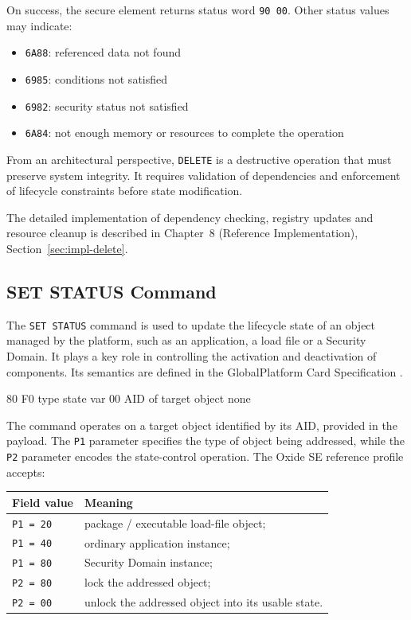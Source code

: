 On success, the secure element returns status word \texttt{90 00}. Other status values
may indicate:
\begin{itemize}
\item \texttt{6A88}: referenced data not found
\item \texttt{6985}: conditions not satisfied
\item \texttt{6982}: security status not satisfied
\item \texttt{6A84}: not enough memory or resources to complete the operation
\end{itemize}

From an architectural perspective, \texttt{DELETE} is a destructive operation
that must preserve system integrity. It requires validation of dependencies and
enforcement of lifecycle constraints before state modification.

The detailed implementation of dependency checking, registry updates and
resource cleanup is described in Chapter~8 (Reference Implementation),
Section~\ref{sec:impl-delete}.

\subsection{SET STATUS Command}

The \texttt{SET STATUS} command is used to update the lifecycle state of an
object managed by the platform, such as an application, a load file or a
Security Domain. It plays a key role in controlling the activation and
deactivation of components. Its semantics are defined in the GlobalPlatform
Card Specification .

\apdudesc
{80}
{F0}
{type}
{state}
{var}
{00}
{AID of target object}
{none}

The command operates on a target object identified by its AID, provided in the
payload.  The \texttt{P1} parameter specifies the type of object being
addressed, while the \texttt{P2} parameter encodes the state-control operation.
The Oxide SE reference profile accepts:

\begin{center}
\begin{tabular}{p{}p{}}
\textbf{Field value} & \textbf{Meaning} \\
\hline
\texttt{P1 = 20} & package / executable load-file object; \\
\texttt{P1 = 40} & ordinary application instance; \\
\texttt{P1 = 80} & Security Domain instance; \\
\texttt{P2 = 80} & lock the addressed object; \\
\texttt{P2 = 00} & unlock the addressed object into its usable state.
\end{tabular}
\end{center}

